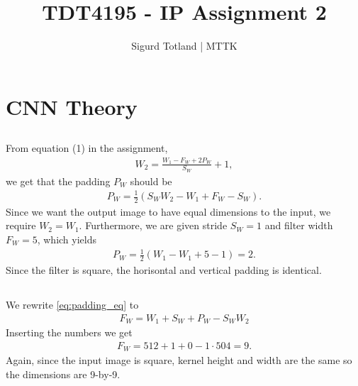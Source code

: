 \documentclass[]{article}
\title{TDT4195 - IP Assignment 2}
\author{Sigurd Totland | MTTK}
\begin{document}
\maketitle

\section{CNN Theory}
\subsection{}
From equation (1) in the assignment,
\begin{equation}\begin{aligned}
\label{eq:padding_eq}
W_2 = \frac{W_1 - F_W + 2 P_W}{S_W} + 1,
\end{aligned}\end{equation}
we get that the padding $P_W$ should be
\begin{equation}\begin{aligned}
P_W = \frac{1}{2}(S_W W_2 - W_1 + F_W - S_W).
\end{aligned}\end{equation}
Since we want the output image to have equal dimensions to the input, we require $W_2 = W_1$. Furthermore, we are given stride $S_W = 1$ and filter width $F_W = 5$, which yields
\begin{equation}\begin{aligned}
P_W = \frac{1}{2}(W_1 - W_1 + 5 - 1) = 2.
\end{aligned}\end{equation}
Since the filter is square, the horisontal and vertical padding is identical.

\subsection{}
We rewrite \eqref{eq:padding_eq} to
\begin{equation}\begin{aligned}
F_W = W_1 + S_W + P_W - S_W W_2
\end{aligned}\end{equation}
Inserting the numbers we get
\begin{equation}\begin{aligned}
F_W = 512 + 1 + 0 - 1 \cdot 504 = 9.
\end{aligned}\end{equation}
Again, since the input image is square, kernel height and width are the same so the dimensions are 9-by-9.
\end{document}
